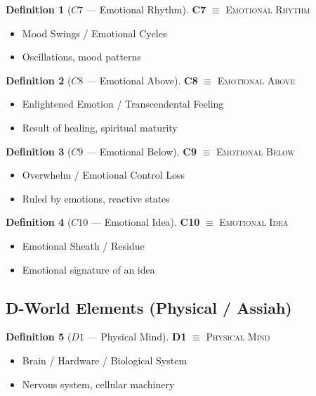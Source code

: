 \documentclass[11pt,twoside,openright]{book}
\theoremstyle{definition}
\newtheorem{definition}{Definition}[chapter]
\theoremstyle{plain}
\theoremstyle{remark}
\begin{document}
\begin{definition}[$C7$ --- Emotional Rhythm]
\label{def:C7}
\textbf{C7} $\equiv$ \textsc{Emotional Rhythm}
\begin{itemize}
  \item Mood Swings / Emotional Cycles
  \item Oscillations, mood patterns
\end{itemize}
\end{definition}

\begin{definition}[$C8$ --- Emotional Above]
\label{def:C8}
\textbf{C8} $\equiv$ \textsc{Emotional Above}
\begin{itemize}
  \item Enlightened Emotion / Transcendental Feeling
  \item Result of healing, spiritual maturity
\end{itemize}
\end{definition}

\begin{definition}[$C9$ --- Emotional Below]
\label{def:C9}
\textbf{C9} $\equiv$ \textsc{Emotional Below}
\begin{itemize}
  \item Overwhelm / Emotional Control Loss
  \item Ruled by emotions, reactive states
\end{itemize}
\end{definition}

\begin{definition}[$C10$ --- Emotional Idea]
\label{def:C10}
\textbf{C10} $\equiv$ \textsc{Emotional Idea}
\begin{itemize}
  \item Emotional Sheath / Residue
  \item Emotional signature of an idea
\end{itemize}
\end{definition}

\subsection{D-World Elements (Physical / Assiah)}

\begin{definition}[$D1$ --- Physical Mind]
\label{def:D1}
\textbf{D1} $\equiv$ \textsc{Physical Mind}
\begin{itemize}
  \item Brain / Hardware / Biological System
  \item Nervous system, cellular machinery
\end{itemize}
\end{definition}
\end{document}
